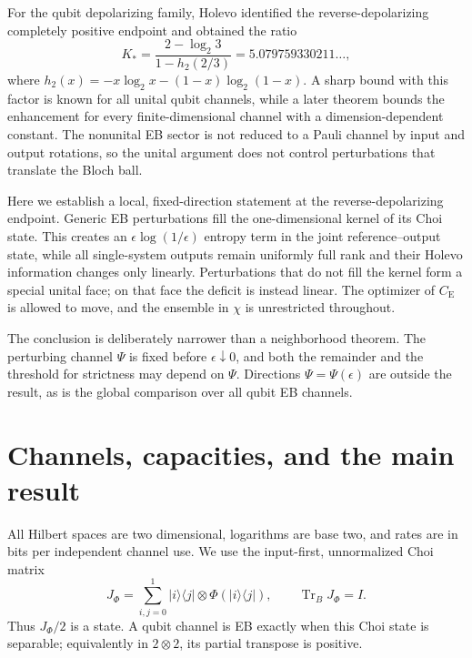 \documentclass[aip,jmp,reprint,amsmath,amssymb]{revtex4-2}
\newcommand{\Tr}{\operatorname{Tr}}
\newcommand{\eps}{\epsilon}
\newcommand{\CE}{C_{\mathrm E}}
\newcommand{\ketbra}[2]{|#1\rangle\!\langle#2|}
\begin{document}
For the qubit depolarizing family, Holevo identified the reverse-depolarizing completely positive endpoint and obtained the ratio\cite{Holevo2002}
\begin{equation}
 K_* = \frac{2-\log_2 3}{1-h_2(2/3)}
      = 5.079759330211\ldots,
 \label{eq:Kstar}
\end{equation}
where $h_2(x)=-x\log_2x-(1-x)\log_2(1-x)$.  A sharp bound with this factor is known for all unital qubit channels,\cite{Belzig2023} while a later theorem bounds the enhancement for every finite-dimensional channel with a dimension-dependent constant.\cite{Wolff2025}  The nonunital EB sector is not reduced to a Pauli channel by input and output rotations, so the unital argument does not control perturbations that translate the Bloch ball.

Here we establish a local, fixed-direction statement at the reverse-depolarizing endpoint.  Generic EB perturbations fill the one-dimensional kernel of its Choi state.  This creates an $\eps\log(1/\eps)$ entropy term in the joint reference--output state, while all single-system outputs remain uniformly full rank and their Holevo information changes only linearly.  Perturbations that do not fill the kernel form a special unital face; on that face the deficit is instead linear.  The optimizer of $\CE$ is allowed to move, and the ensemble in $\chi$ is unrestricted throughout.

The conclusion is deliberately narrower than a neighborhood theorem.  The perturbing channel $\Psi$ is fixed before $\eps\downarrow0$, and both the remainder and the threshold for strictness may depend on $\Psi$.  Directions $\Psi=\Psi(\eps)$ are outside the result, as is the global comparison over all qubit EB channels.

\section{Channels, capacities, and the main result}
\label{sec:model}

All Hilbert spaces are two dimensional, logarithms are base two, and rates are in bits per independent channel use.  We use the input-first, unnormalized Choi matrix
\begin{equation}
 J_\Phi=\sum_{i,j=0}^{1}\ketbra{i}{j}\otimes\Phi(\ketbra{i}{j}),
 \qquad \Tr_BJ_\Phi=I.
 \label{eq:choi}
\end{equation}
Thus $J_\Phi/2$ is a state.  A qubit channel is EB exactly when this Choi state is separable; equivalently in $2\otimes2$, its partial transpose is positive.\cite{Horodecki2003,Ruskai2003}
\end{document}
